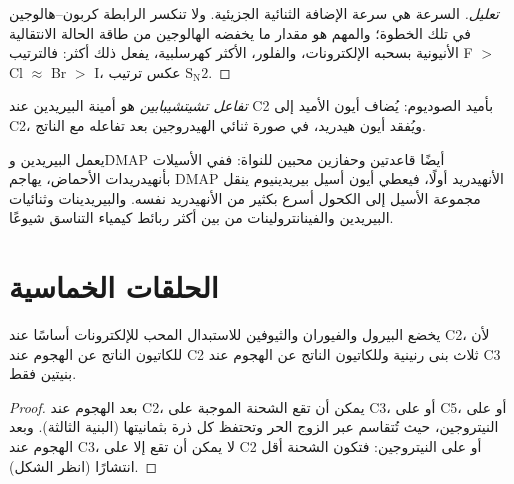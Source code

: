 \begin{proof}[تعليل]
السرعة هي سرعة الإضافة الثنائية الجزيئية. ولا تنكسر الرابطة كربون--هالوجين
في تلك الخطوة؛ والمهم هو مقدار ما يخفضه الهالوجين من طاقة
الحالة الانتقالية الأنيونية بسحبه الإلكترونات، والفلور، الأكثر
كهرسلبية، يفعل ذلك أكثر: فالترتيب F $>$ Cl $\approx$ Br $>$ I، عكس ترتيب $\mathrm S_\mathrm N2$.
\end{proof}

\begin{definition}\label{def:b3:heterocycles:chichibabin}
\emph{تفاعل تشيتشيبابين} هو أمينة
البيريدين عند C2 بأميد الصوديوم: يُضاف أيون الأميد إلى C2، ويُفقد أيون هيدريد،
في صورة ثنائي الهيدروجين بعد تفاعله مع الناتج.
\end{definition}

يعمل البيريدين وDMAP أيضًا قاعدتين وحفازين محبين للنواة: ففي
الأسيلات بأنهيدريدات الأحماض، يهاجم DMAP الأنهيدريد أولًا، فيعطي
أيون أسيل بيريدينيوم ينقل مجموعة الأسيل إلى الكحول أسرع بكثير من
الأنهيدريد نفسه. والبيريدينات وثنائيات البيريدين والفينانترولينات من بين
أكثر ربائط كيمياء التناسق شيوعًا.

\section{الحلقات الخماسية}

\begin{proposition}\label{prop:b3:heterocycles:pyrrole-c2}
يخضع البيرول والفيوران والثيوفين للاستبدال المحب للإلكترونات أساسًا عند C2،
لأن للكاتيون الناتج عن الهجوم عند C2 ثلاث بنى رنينية وللكاتيون
الناتج عن الهجوم عند C3 بنيتين فقط.
\end{proposition}

\begin{proof}
بعد الهجوم عند C2، يمكن أن تقع الشحنة الموجبة على C3، أو على C5، أو على النيتروجين،
حيث تُتقاسم عبر الزوج الحر وتحتفظ كل ذرة بثمانيتها (البنية
الثالثة). وبعد الهجوم عند C3، لا يمكن أن تقع إلا على C2 أو على النيتروجين: فتكون الشحنة
أقل انتشارًا (انظر الشكل).
\end{proof}

